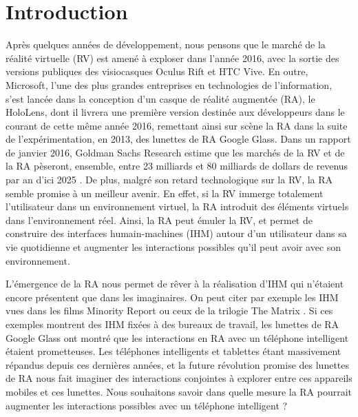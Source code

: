 \section*{Introduction}
Après quelques années de développement, nous pensons que le marché de la réalité virtuelle (RV) est amené à exploser dans l'année 2016, avec la sortie des versions publiques des visiocasques Oculus Rift et HTC Vive. En outre, Microsoft, l'une des plus grandes entreprises en technologies de l'information, s'est lancée dans la conception d'un casque de réalité augmentée (RA), le HoloLens, dont il livrera une première version destinée aux développeurs dans le courant de cette même année 2016, remettant ainsi sur scène la RA dans la suite de l'expérimentation, en 2013, des lunettes de RA Google Glass. Dans un rapport de janvier 2016, Goldman Sachs Research estime que les marchés de la RV et de la RA pèseront, ensemble, entre 23 milliards et 80 milliards de dollars de revenus par an d'ici 2025 \citep{BelliniChenSugiyamaEtAl2016}. De plus, malgré son retard technologique sur la RV, la RA semble promise à un meilleur avenir. \citep{BelliniChenSugiyamaEtAl2016} En effet, si la RV immerge totalement l'utilisateur dans un environnement virtuel, la RA introduit des éléments virtuels dans l'environnement réel. Ainsi, la RA peut émuler la RV, et permet de construire des interfaces humain-machines (IHM) autour d'un utilisateur dans sa vie quotidienne et augmenter les interactions possibles qu'il peut avoir avec son environnement.

L'émergence de la RA nous permet de rêver à la réalisation d'IHM qui n'étaient encore présentent que dans les imaginaires. On peut citer par exemple les IHM vues dans les films Minority Report  ou ceux de la trilogie The Matrix . Si ces exemples montrent des IHM fixées à des bureaux de travail, les lunettes de RA Google Glass ont montré que les interactions en RA avec un téléphone intelligent étaient prometteuses. Les téléphones intelligents et tablettes étant massivement répandus depuis ces dernières années, et la future révolution promise des lunettes de RA nous fait imaginer des interactions conjointes à explorer entre ces appareils mobiles et ces lunettes. Nous souhaitons savoir dans quelle mesure la RA pourrait augmenter les interactions possibles avec un téléphone intelligent ?


